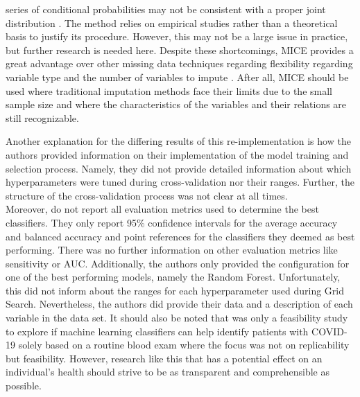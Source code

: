 series of conditional probabilities may not be consistent with a proper joint 
distribution \cite{RN141}. The method relies on empirical studies rather than a 
theoretical basis to justify its procedure. However, this may not be a large 
issue in practice, but further research is needed here. Despite these 
shortcomings, MICE 
provides a great advantage over other missing data techniques regarding 
flexibility regarding variable type and the number of variables to impute 
\cite{RN141, RN142}. After all, MICE should be used where traditional 
imputation methods face their limits due to the small sample size and where the 
characteristics of the variables and their relations are still recognizable.
\par
Another explanation for the differing results of this re-implementation is how 
the authors provided information on their implementation of the model 
training and selection process. Namely, they did not provide detailed 
information about which hyperparameters were tuned during cross-validation nor 
their ranges. Further, the structure of the cross-validation process was not 
clear at all times.
\\
Moreover, \citeauthor{RN127} do not report all evaluation metrics used to 
determine the best classifiers. They only report 95\% confidence intervals for 
the average accuracy and balanced accuracy and point references for the 
classifiers they deemed as best performing. There was no further information 
on other evaluation metrics like sensitivity or AUC. Additionally, the authors 
only provided the configuration for one of the best performing models, 
namely the Random Forest. Unfortunately, this did not inform about the ranges 
for each hyperparameter used during Grid Search.
Nevertheless, the authors did provide their data and a description of each 
variable in the data set. It should also be noted that \cite{RN127} was only a 
feasibility study to explore if machine learning classifiers can help identify 
patients with COVID-19 solely based on a routine blood exam where the focus was 
not on replicability but feasibility. However, research like this that has a 
potential effect on an individual's health should strive to be as transparent 
and comprehensible as possible.
